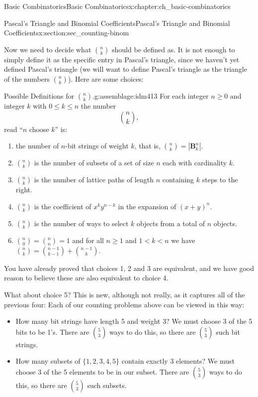 \documentclass[oneside,10pt,]{book}
\numberwithin{equation}{chapter}
\def\B{\mathbf{B}}
\newcommand{\lt}{<}
\begin{document}
\begin{chapterptx}{Basic Combinatorics}{}{Basic Combinatorics}{}{}{x:chapter:ch_basic-combinatorics}
\begin{sectionptx}{Pascal's Triangle and Binomial Coefficients}{}{Pascal's Triangle and Binomial Coefficients}{}{}{x:section:sec_counting-binom}
\par
Now we need to decide what \(\binom{n}{k}\) should be defined as.  It is not enough to simply define it as the specific entry in Pascal's triangle, since we haven't yet defined Pascal's triangle (we will want to define Pascal's triangle as the triangle of the numbers \(\binom{n}{k}\)).  Here are some choices:%
\begin{assemblage}{Possible Definitions for \(\binom{n}{k}\).}{g:assemblage:idm413}%
 For each integer \(n \ge 0\) and integer \(k\) with \(0 \le k \le n\) the number%
\begin{equation*}
{n\choose k},
\end{equation*}
read ``\(n\) choose \(k\)'' is:%
\begin{enumerate}
\item{}the number of \(n\)-bit strings of weight \(k\), that is, \({n\choose k} = |\B^n_k|\).%
\item{}\({n \choose k}\) is the number of subsets of a set of size \(n\) each with cardinality \(k\).%
\item{}\({n \choose k}\) is the number of lattice paths of length \(n\) containing \(k\) steps to the right.%
\item{}\({n \choose k}\) is the coefficient of \(x^ky^{n-k}\) in the expansion of \((x+y)^n\).%
\item{}\({n \choose k}\) is the number of ways to select \(k\) objects from a total of \(n\) objects.%
\item{}\(\binom{n}{0} = \binom{n}{n} = 1\) and for all \(n \ge 1\) and \(1 \lt k \lt n\) we have \(\binom{n}{k} = \binom{n-1}{k-1} + \binom{n-1}{k}\).%
\end{enumerate}
%
\end{assemblage}
You have already proved that choices 1, 2 and 3 are equivalent, and we have good reason to believe these are also equivalent to choice 4.%
\par
What about choice 5?  This is new, although not really, as it captures all of the previous four: Each of our counting problems above can be viewed in this way:%
\begin{itemize}[label=\textbullet]
\item{}How many bit strings have length 5 and weight 3?  We must choose \(3\) of the 5 bits to be 1's.  There are \({5 \choose 3}\) ways to do this, so there are \({5 \choose 3}\) such bit strings.%
\item{}How many subsets of \(\{1,2,3,4,5\}\) contain exactly 3 elements?  We must choose \(3\) of the 5 elements to be in our subset.  There are \({5 \choose 3}\) ways to do this, so there are \({5 \choose 3}\) such subsets.%

\end{itemize}
\end{sectionptx}
\end{chapterptx}
\end{document}
